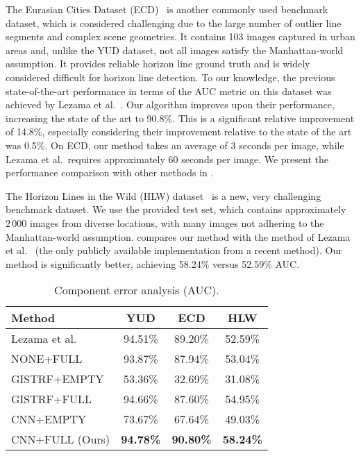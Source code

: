 The Eurasian Cities Dataset (ECD)~\cite{geoparser2010} is another
commonly used benchmark dataset, which is considered challenging due
to the large number of outlier line segments and complex scene
geometries. It contains 103 images captured in urban areas and, unlike
the YUD dataset, not all images satisfy the Manhattan-world
assumption. It provides reliable horizon line ground truth and is
widely considered difficult for horizon line detection. To our
knowledge, the previous state-of-the-art performance in terms of the
AUC metric on this dataset was achieved by Lezama et
al.~\cite{alignment2014}. Our algorithm improves upon their
performance, increasing the state of the art to 90.8\%.  This is a
significant relative improvement of 14.8\%, especially considering
their improvement relative to the state of the art was 0.5\%.  On ECD,
our method takes an average of 3 seconds per image, while Lezama et
al.\ requires approximately 60 seconds per image. We present the
performance comparison with other methods in .


The Horizon Lines in the Wild (HLW)
dataset~\cite{authors2016deephorizon} is a new, very challenging
benchmark dataset. We use the provided test set, which contains
approximately $2\,000$ images from diverse locations, with many images
not adhering to the Manhattan-world assumption. 
compares our method with the method of Lezama et
al.~\cite{alignment2014} (the only publicly available implementation
from a recent method). Our method is significantly better, achieving
58.24\% versus 52.59\% AUC.

\begin{table}[t] \centering
  \caption{Component error analysis (AUC).}
  \vspace{-.5em}
  \begin{tabular}{|l|c|c|c|}
    \hline
    Method & YUD & ECD & HLW \\
    \hline
    \hline
    Lezama et al.~\cite{alignment2014} & 94.51\% & 89.20\% & 52.59\% \\
    \hline
    NONE+FULL & 93.87\% & 87.94\% & 53.04\% \\
    \hline
    GISTRF+EMPTY & 53.36\% &  32.69\% & 31.08\% \\
    GISTRF+FULL & 94.66\% &  87.60\% & 54.95\% \\
    \hline
    CNN+EMPTY & 73.67\% &  67.64\% & 49.03\% \\
    CNN+FULL (Ours) & \textbf{94.78\%} & \textbf{90.80\%} & \textbf{58.24\%} \\
    \hline
  \end{tabular}
  \label{tab:contribution}
\end{table}

